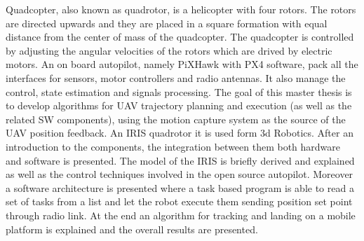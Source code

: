 

\begin{abstracts}

Quadcopter, also known as quadrotor, is a helicopter with four rotors. The rotors are directed upwards and they are placed in a square formation with equal distance from the center of mass of the quadcopter. The quadcopter is controlled by adjusting the angular velocities of the rotors which are drived by electric motors. An on board autopilot, namely PiXHawk with PX4 software, pack all the interfaces for sensors, motor controllers and radio antennas. It also manage the control, state estimation and signals processing. The goal of this master thesis is to develop algorithms for UAV trajectory planning and execution (as well as the related SW components), using the motion capture system as the source of the UAV position feedback. An IRIS quadrotor it is used form 3d Robotics. After an introduction to the components, the integration between them both hardware and software is presented. The model of the IRIS is briefly derived and explained as well as the control techniques involved in the open source autopilot. Moreover a software architecture is presented where a task based program is able to read a set of tasks from a list and let the robot execute them sending position set point through radio link. At the end an algorithm for tracking and landing on a mobile platform is explained and the overall results are presented.

\end{abstracts}